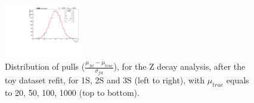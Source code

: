 \begin{figure}[!htbp]
\begin{center}
\includegraphics[width=0.3\textwidth]{figures/modeling_xchecks/plots/ZToUpsilon3SPhoton_Cat0_signalStrenght_1000/pulls}
\end{center}
\caption{Distribution of pulls ($\frac{\mu_{fit} - \mu_{true}}{\sigma_{fit}}$), for the Z decay analysis, after the toy dataset refit, for 1S, 2S and 3S (left to right), with $\mu_{true}$ equals to 20, 50, 100, 1000 (top to bottom).}
\label{fig:modeling_xchecks_Z}
\end{figure}




